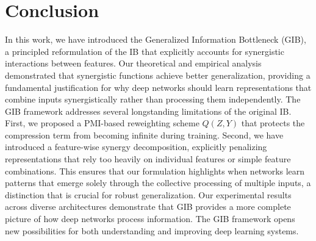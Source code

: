 \documentclass{article}
\theoremstyle{definition}
\theoremstyle{remark}
\newcommand{\mm}[1]{\footnote{\textbf{Mirco: #1}}}
\begin{document}
\section{Conclusion}
In this work, we have introduced the Generalized Information Bottleneck (GIB), a principled reformulation of the IB that explicitly accounts for synergistic interactions between features. Our theoretical and empirical analysis demonstrated that synergistic functions achieve better generalization, providing a fundamental justification for why deep networks should learn representations that combine inputs synergistically rather than processing them independently. The GIB framework addresses several longstanding limitations of the original IB. First, we proposed a PMI-based reweighting scheme $Q(Z,Y)$ that protects the compression term from becoming infinite during training. Second, we have introduced a feature-wise synergy decomposition, explicitly penalizing representations that rely too heavily on individual features or simple feature combinations. This ensures that our formulation highlights when networks learn patterns that emerge solely through the collective processing of multiple inputs, a distinction that is crucial for robust generalization. Our experimental results across diverse architectures demonstrate that GIB provides a more complete picture of how deep networks process information. The GIB framework opens new possibilities for both understanding and improving deep learning systems.





\end{document}
